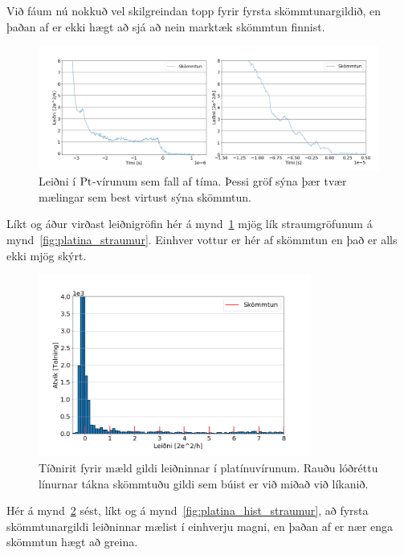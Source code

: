 \documentclass[11pt]{article}
\begin{document}
Við fáum nú nokkuð vel skilgreindan topp fyrir fyrsta skömmtunargildið, en þaðan af er ekki hægt að sjá að nein marktæk skömmtun finnist.


\begin{figure}[H]
    \centering
    \includegraphics[width=1\textwidth]{saman-leidni.png}
    \caption{Leiðni í $\ce{Pt}$-vírunum sem fall af tíma. Þessi gröf sýna þær tvær mælingar sem best virtust sýna skömmtun.}
    \label{fig:platina_leidni}
\end{figure}

Líkt og áður virðast leiðnigröfin hér á mynd~\ref{fig:platina_leidni} mjög lík straumgröfunum á mynd~\ref{fig:platina_straumur}. Einhver vottur er hér af skömmtun en það er alls ekki mjög skýrt. 


\begin{figure}[H]
    \centering
    \includegraphics[width=0.8\textwidth]{plat-hist-leidni1.png}
    \caption{Tíðnirit fyrir mæld gildi leiðninnar í platínuvírunum. Rauðu lóðréttu línurnar tákna skömmtuðu gildi sem búist er við miðað við líkanið.}
    \label{fig:platina_hist_leidni}
\end{figure}

Hér á mynd~\ref{fig:platina_hist_leidni} sést, líkt og á mynd~\ref{fig:platina_hist_straumur}, að fyrsta skömmtunargildi leiðninnar mælist í einhverju magni, en þaðan af er nær enga skömmtun hægt að greina. 
\end{document}
